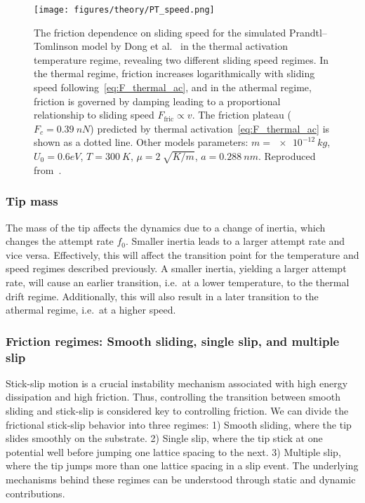 \begin{figure}[!htb]
  \centering
  \texttt{[image: figures/theory/PT\_speed.png]}
  \caption{The friction dependence on sliding speed for the simulated Prandtl–Tomlinson model by Dong et al.~\cite{Yalin_2011} in the thermal activation temperature regime, revealing two different sliding speed regimes. In the thermal regime, friction increases logarithmically with sliding speed following~\cref{eq:F_thermal_ac}, and in the athermal regime, friction is governed by damping leading to a proportional relationship to sliding speed $F_{\text{fric}}\propto v$. The friction plateau ($F_c = \SI{0.39}{nN}$) predicted by thermal activation~\cref{eq:F_thermal_ac} is shown as a dotted line. Other models parameters: $m=\SI{e-12}{kg}$, $U_0={0.6}{eV}$, $T = \SI{300}{K}$, $\mu=\SI{2}{\sqrt{K/m}}$, $a=\SI{0.288}{nm}$. Reproduced from~\cite{Yalin_2011}.}
  \label{fig:PT_speed}
\end{figure}


\subsubsection{Tip mass}
The mass of the tip affects the dynamics due to a change of inertia, which changes the attempt rate $f_0$. Smaller inertia leads to a larger attempt rate and vice versa. Effectively, this will affect the transition point for the temperature and speed regimes described previously. A smaller inertia, yielding a larger attempt rate, will cause an earlier transition, i.e.\ at a lower temperature, to the thermal drift regime. Additionally, this will also result in a later transition to the athermal regime, i.e.\ at a higher speed.


\subsubsection{Friction regimes: Smooth sliding, single slip, and multiple slip}
Stick-slip motion is a crucial instability mechanism associated with high energy dissipation and high friction. Thus, controlling the transition between smooth sliding and stick-slip is considered key to controlling friction. We can divide the frictional stick-slip behavior into three regimes: 1) Smooth sliding, where the tip slides smoothly on the substrate. 2) Single slip, where the tip stick at one potential well before jumping one lattice spacing to the next. 3) Multiple slip, where the tip jumps more than one lattice spacing in a slip event. The underlying mechanisms behind these regimes can be understood through static and dynamic contributions. 

